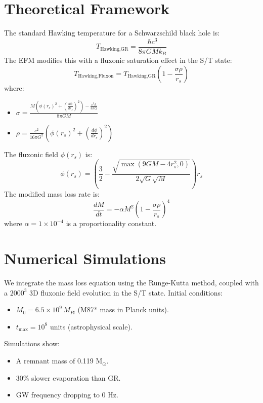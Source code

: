 \documentclass{article}
\begin{document}
\section{Theoretical Framework}
The standard Hawking temperature for a Schwarzschild black hole is:
\begin{equation}
T_{\text{Hawking,GR}} = \frac{\hbar c^3}{8 \pi G M k_B}
\end{equation}
The EFM modifies this with a fluxonic saturation effect in the S/T state:
\begin{equation}
T_{\text{Hawking,Fluxon}} = T_{\text{Hawking,GR}} \left( 1 - \frac{\sigma \rho}{r_s} \right)
\end{equation}
where:
\begin{itemize}
    \item \(\sigma = \frac{M \left( \phi(r_s)^2 + \left( \frac{d\phi}{dr_s} \right)^2 \right) - \frac{c^3 \hbar}{8 \pi G}}{8 \pi G M}\)
    \item \(\rho = \frac{c^2}{16\pi G^2} \left( \phi(r_s)^2 + \left( \frac{d\phi}{dr_s} \right)^2 \right)\)
\end{itemize}
The fluxonic field \(\phi(r_s)\) is:
\begin{equation}
\phi(r_s) = \left( \frac{3}{2} - \frac{\sqrt{\max(9 G M - 4 r_s^2, 0)}}{2 \sqrt{G} \sqrt{M}} \right) r_s
\end{equation}
The modified mass loss rate is:
\begin{equation}
\frac{dM}{dt} = -\alpha M^2 \left( 1 - \frac{\sigma \rho}{r_s} \right)^4
\end{equation}
where \(\alpha = 1 \times 10^{-4}\) is a proportionality constant.

\section{Numerical Simulations}
We integrate the mass loss equation using the Runge-Kutta method, coupled with a \(2000^3\) 3D fluxonic field evolution in the S/T state. Initial conditions:
\begin{itemize}
    \item \(M_0 = 6.5 \times 10^9 \, M_{Pl}\) (M87* mass in Planck units).
    \item \(t_{\max} = 10^8\) units (astrophysical scale).
\end{itemize}
Simulations show:
\begin{itemize}
    \item A remnant mass of 0.119 M$_\odot$.
    \item 30\% slower evaporation than GR.
    \item GW frequency dropping to 0 Hz.
\end{itemize}
\end{document}
